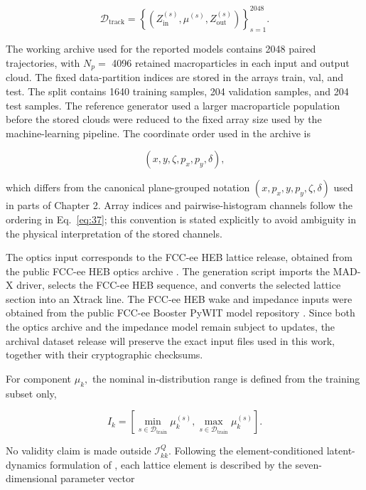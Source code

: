 \begin{equation}
\label{eq:36}
\mathcal D_{\mathrm{track}}=\left\{\left(Z_{\mathrm{in}}^{(s)},\mu^{(s)},Z_{\mathrm{out}}^{(s)}\right)\right\}_{s=1}^{2048}.
\end{equation}

The working archive used for the reported models contains 2048 paired trajectories, with \(N_{p} =\) 4096 retained macroparticles in each input and output cloud. The fixed data-partition indices are stored in the arrays train, val, and test. The split contains 1640 training samples, 204 validation samples, and 204 test samples. The reference generator used a larger macroparticle population before the stored clouds were reduced to the fixed array size used by the machine-learning pipeline. The coordinate order used in the archive is

\begin{equation}
\label{eq:37}
(x,y,\zeta,p_x,p_y,\delta),
\end{equation}

which differs from the canonical plane-grouped notation \(( x , p_{x} , y , p_{y} , \zeta , \delta )\) used in parts of Chapter 2. Array indices and pairwise-histogram channels follow the ordering in Eq.~\eqref{eq:37}; this convention is stated explicitly to avoid ambiguity in the physical interpretation of the stored channels.

The optics input corresponds to the FCC-ee HEB lattice release, obtained from the public FCC-ee HEB optics archive \cite{fcc2026lattice}. The generation script imports the MAD-X driver, selects the FCC-ee HEB sequence, and converts the selected lattice section into an Xtrack line. The FCC-ee HEB wake and impedance inputs were obtained from the public FCC-ee Booster PyWIT model repository \cite{impedan2026pywit}. Since both the optics archive and the impedance model remain subject to updates, the archival dataset release will preserve the exact input files used in this work, together with their cryptographic checksums.

For component \(\mu_{k} ,\) the nominal in-distribution range is defined from the training subset only,

\begin{equation}
\label{eq:38}
I_k=\left[\min_{s\in\mathcal D_{\mathrm{train}}}\mu_k^{(s)},\max_{s\in\mathcal D_{\mathrm{train}}}\mu_k^{(s)}\right].
\end{equation}

No validity claim is made outside \(\mathcal{I}_{k k}^{Q} .\) Following the element-conditioned latent-dynamics formulation of \cite{wang2026latent}, each lattice element is described by the seven-dimensional parameter vector

